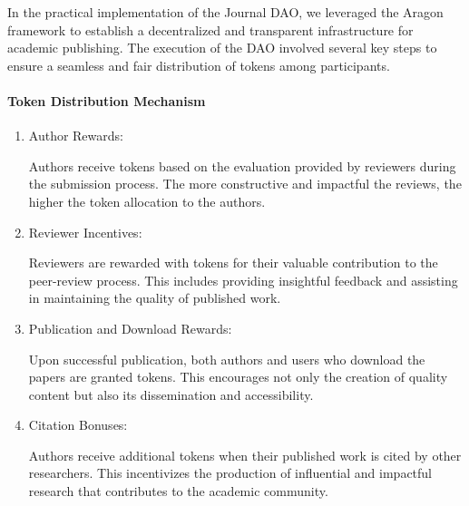 \documentclass[lettersize,journal]{IEEEtran}
\begin{document}
In the practical implementation of the Journal DAO, we leveraged the Aragon framework to establish a decentralized and transparent infrastructure for academic publishing. The execution of the DAO involved several key steps to ensure a seamless and fair distribution of tokens among participants.

\paragraph{Token Distribution Mechanism}

\begin{enumerate}
  \item Author Rewards:

  Authors receive tokens based on the evaluation provided by reviewers during the submission process. The more constructive and impactful the reviews, the higher the token allocation to the authors.

  \item Reviewer Incentives:
  
  Reviewers are rewarded with tokens for their valuable contribution to the peer-review process. This includes providing insightful feedback and assisting in maintaining the quality of published work.
  
  \item Publication and Download Rewards:
  
  Upon successful publication, both authors and users who download the papers are granted tokens. This encourages not only the creation of quality content but also its dissemination and accessibility.

  \item Citation Bonuses:

  Authors receive additional tokens when their published work is cited by other researchers. This incentivizes the production of influential and impactful research that contributes to the academic community.

\end{enumerate}
\end{document}
